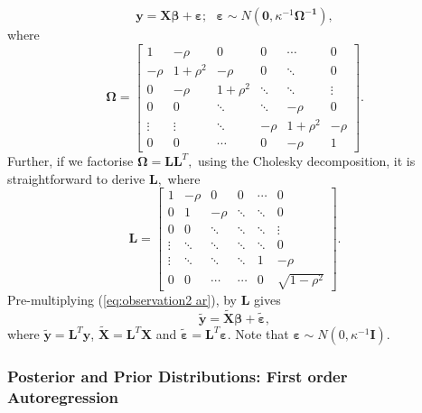 \documentclass[article]{jss}
\begin{document}
\begin{equation}
\bm{y}=\bm{X}\bm{\beta}+\bm{\varepsilon};\,\,\,\,\bm{\varepsilon}\sim N\left(\bm{0},\kappa^{-1}\bm{\Omega^{-1}}\right),\label{eq:observation2 ar}\end{equation}
 where \[
\bm{\Omega}=\left[\begin{array}{cccccc}
1 & -\rho & 0 & 0 & \cdots & 0\\
-\rho & 1+\rho^{2} & -\rho & 0 & \ddots & 0\\
0 & -\rho & 1+\rho^{2} & \ddots & \ddots & \vdots\\
0 & 0 & \ddots & \ddots & -\rho & 0\\
\vdots & \vdots & \ddots & -\rho & 1+\rho^{2} & -\rho\\
0 & 0 & \cdots & 0 & -\rho & 1\end{array}\right].\]
 Further, if we factorise $\bm{\Omega}=\bm{L}\bm{L}^{T},$ using the
Cholesky decomposition, it is straightforward to derive $\bm{L},$
where\[
\bm{L}=\left[\begin{array}{cccccc}
1 & -\rho & 0 & 0 & \cdots & 0\\
0 & 1 & -\rho & \ddots & \ddots & 0\\
0 & 0 & \ddots & \ddots & \ddots & \vdots\\
\vdots & \ddots & \ddots & \ddots & \ddots & 0\\
\vdots & \ddots & \ddots & \ddots & 1 & -\rho\\
0 & 0 & \cdots & \cdots & 0 & \sqrt{1-\rho^{2}}\end{array}\right].\]
 Pre-multiplying (\ref{eq:observation2 ar}), by $\bm{L}$ gives\begin{equation}
\bm{\tilde{y}}=\bm{\tilde{X}}\bm{\beta}+\bm{\tilde{\varepsilon}},\label{eq:trans_obs_ar}\end{equation}
 where $\bm{\tilde{y}}=\bm{L}^{T}\bm{y}$, $\bm{\tilde{X}}=\bm{L}^{T}\bm{X}$
and $\tilde{\bm{\varepsilon}}=\bm{L}^{T}\bm{\varepsilon}.$ Note that
$\bm{\varepsilon}\sim N(0,\kappa^{-1}\bm{I})$.


\subsubsection{Posterior and Prior Distributions: First order Autoregression}
\end{document}
